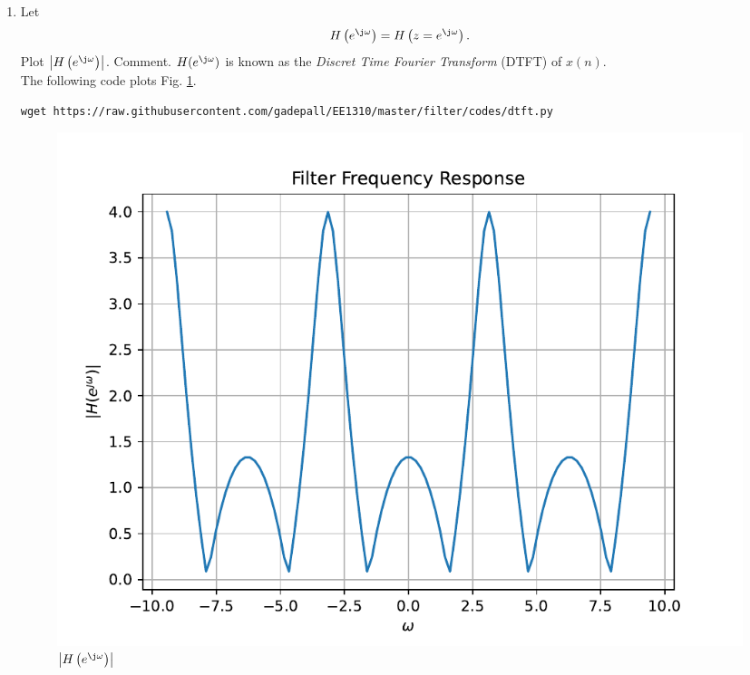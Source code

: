 \documentclass[journal,12pt,twocolumn]{IEEEtran}
\renewcommand\thesection{\arabic{section}}
\begin{document}
\begin{enumerate}[label=\thesection.\arabic*]
\item 
Let
\begin{equation}
H\brak{e^{\j \omega}} = H\brak{z = e^{\j \omega}}.
\end{equation}
Plot $\abs{H\brak{e^{\j \omega}}}$.  Comment.  $H(e^{\j \omega})$ is
known as the {\em Discret Time Fourier Transform} (DTFT) of $x(n)$.
\\
\solution The following code plots Fig. \ref{fig:dtft}.
\begin{lstlisting}
wget https://raw.githubusercontent.com/gadepall/EE1310/master/filter/codes/dtft.py
\end{lstlisting}
\begin{figure}[!ht]
\centering
\includegraphics[width=\columnwidth]{./figs/dtft}
\caption{$\abs{H\brak{e^{\j\omega}}}$}
\label{fig:dtft}
\end{figure}
\end{enumerate}
\end{document}
